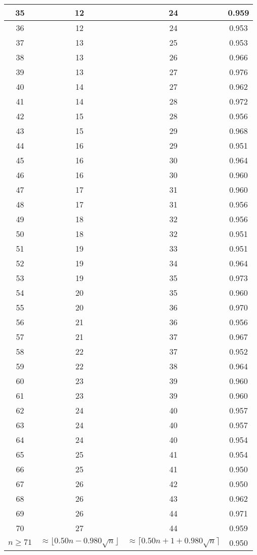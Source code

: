 \begin{table}
{\begin{tabular}{|c|c|c|c|}
	35&12&24&0.959 \\  \hline 
	36&12&24&0.953 \\  \hline 
	37&13&25&0.953 \\  \hline 
	38&13&26&0.966 \\  \hline 
	39&13&27&0.976 \\  \hline 
	40&14&27&0.962 \\  \hline 
	41&14&28&0.972 \\  \hline 
	42&15&28&0.956 \\  \hline 
	43&15&29&0.968 \\  \hline 
	44&16&29&0.951 \\  \hline 
	45&16&30&0.964 \\  \hline 
	46&16&30&0.960 \\  \hline 
	47&17&31&0.960 \\  \hline 
	48&17&31&0.956 \\  \hline 
	49&18&32&0.956 \\  \hline 
	50&18&32&0.951 \\  \hline 
	51&19&33&0.951 \\  \hline 
	52&19&34&0.964 \\  \hline 
	53&19&35&0.973 \\  \hline 
	54&20&35&0.960 \\  \hline 
	55&20&36&0.970 \\  \hline 
	56&21&36&0.956 \\  \hline 
	57&21&37&0.967 \\  \hline 
	58&22&37&0.952 \\  \hline 
	59&22&38&0.964 \\  \hline 
	60&23&39&0.960 \\  \hline 
	61&23&39&0.960 \\  \hline 
	62&24&40&0.957 \\  \hline 
	63&24&40&0.957 \\  \hline 
	64&24&40&0.954 \\  \hline 
	65&25&41&0.954 \\  \hline 
	66&25&41&0.950 \\  \hline 
	67&26&42&0.950 \\  \hline 
	68&26&43&0.962 \\  \hline 
	69&26&44&0.971 \\  \hline 
	70&27&44&0.959 \\ \hline 
$ 	n \geq71 $ & $\approx \lfloor 0.50n - 0.980\sqrt{n}\rfloor$& $\approx \lceil 0.50n+1+0.980\sqrt{n}\rceil$&0.950  \\ \hline 
	\end{tabular} 
}
\label{fig:thereme-2-1-ci-median}
\end{table}
